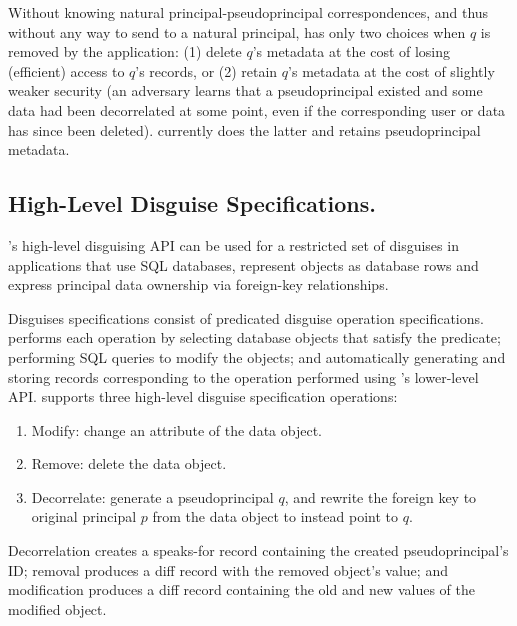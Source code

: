 Without knowing natural principal-pseudoprincipal correspondences, and thus without any way to send
 to a natural principal, \sys has only two choices when $q$ is removed by the application:
(1) delete $q$'s metadata at the cost of losing (efficient) access to $q$'s records, or (2) retain
$q$'s metadata at the cost of slightly weaker security (an adversary learns that a pseudoprincipal
existed and some data had been decorrelated at some point, even if the corresponding user or data
has since been deleted). \sys currently does the latter and retains pseudoprincipal metadata.

\subsection{High-Level Disguise Specifications.} 
\sys's high-level disguising API can be used for a restricted set of disguises in applications that
use SQL databases, represent objects as database rows and express principal data ownership via
foreign-key relationships.

Disguises specifications consist of predicated disguise operation specifications. \sys performs each operation
by selecting database objects that satisfy the predicate; performing SQL queries to modify the
objects; and automatically generating and storing records corresponding to the operation performed
using \sys's lower-level API.
\sys supports three high-level disguise specification operations:
\begin{enumerate}
    \item Modify: change an attribute of the data object.
    \item Remove: delete the data object.
    \item Decorrelate: generate a pseudoprincipal $q$, and rewrite the foreign key to original
        principal $p$ from the data object to instead point to $q$. 
\end{enumerate}
Decorrelation creates a speaks-for record  containing the created pseudoprincipal's
ID; removal produces a diff record  with the removed object's value; and modification
produces a diff record  containing the old and new values of the modified object.

